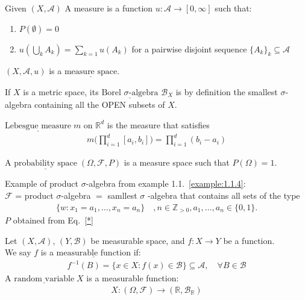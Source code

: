 \documentclass[11pt]{article}
\begin{document}
\begin{definition}
    Given $(X, \mathcal{A})$
    A measure is a function $u: \mathcal{A} \to [0, \infty]$ such that:
    \begin{enumerate}
        \item $P(\emptyset) = 0$
        \item $u( \bigcup_{k}A_k) = \sum_{k=1}u(A_k)$ for a pairwise disjoint sequence $\{A_k\}_k \subseteq \mathcal{A}$
    \end{enumerate}
    $(X, \mathcal{A}, u)$ is a $\underline{\text{measure space}}$.
\end{definition}

\begin{definition}
    If $X$ is a metric space, its $\underline{\text{Borel } \sigma\text{-algebra}} \,\, \mathcal{B}_{X}$ is by
    definition the smallest $\sigma$-algebra containing all the OPEN subsets of $X$.
\end{definition}

\begin{definition}
    $\underline{\text{Lebesgue measure}} \; m$ on $\mathbb{R}^d$ is the measure that satisfies 
    \begin{align*}
        m\Big( \prod_{i=1}^{d} [a_i,b_i]\Big) = \prod_{i=1}^{d} (b_i-a_i)
    \end{align*}
\end{definition}

\begin{definition}
    A $\underline{\text{probability space}} \; (\Omega, \mathcal{F}, P)$ is a measure space such that $P(\Omega) = 1$.
\end{definition}

\begin{example}
    Example of product $\sigma$-algebra from example 1.1.~\ref{example:1.1.4}: \\
    $\mathcal{F}$ = product $\sigma$-algebra $=$ samllest $\sigma$ -algebra that contains all sets of the type
    \begin{align*}
        \{w: x_1 = a_1, \ldots , x_{n} = a_{n}\} \quad , n \in \mathbb{Z}_{>0}, a_{1}, \ldots ,a_n \in \{0,1 \}.
    \end{align*}
    $P$ obtained from Eq.~\ref{*}
\end{example}

\begin{definition}
    Let $(X, \mathcal{A}), \, (Y, \mathcal{B})$ be measurable space, and $f: X \to Y$ be a function.\\
    We say $f$ is a $\underline{\text{measurable function}}$ if:
    \begin{align*}
        f^{-1}(B) = \{x \in X: f(x) \in \mathcal{B} \} \subseteq \mathcal{A}, \quad \forall B \in \mathcal{B}
    \end{align*}
    A $\underline{\text{random variable}} \; X$ is a measurable function:
    \begin{align*}
        X: (\Omega, \mathcal{F}) \to (\mathbb{R}, \mathcal{B}_{\mathbb{R}})
    \end{align*}
\end{definition}
\end{document}
